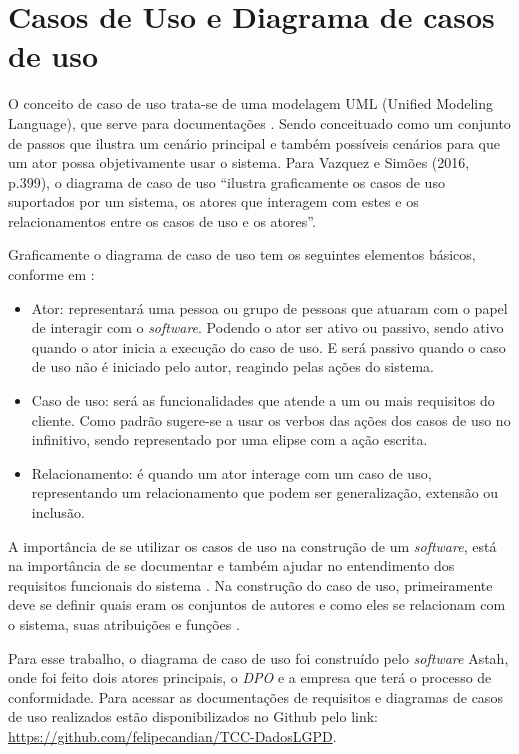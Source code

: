 \documentclass[
	12pt,				%
	openright,			%
	oneside,			%
	a4paper,			%
	english,			%
	french,				%
	spanish,			%
	brazil,				%
	]{abntex2}
\begin{document}
\section{Casos de Uso e Diagrama de casos de uso}

O conceito de caso de uso trata-se de uma modelagem UML (Unified Modeling Language), que serve para documentações  \cite{Sommerville2011}. Sendo conceituado como um conjunto de passos que ilustra um cenário principal e também possíveis cenários para que um ator possa objetivamente usar o sistema. Para Vazquez e Simões (2016, p.399), o diagrama de caso de uso “ilustra graficamente os casos de uso suportados por um sistema, os atores que interagem com estes e os relacionamentos entre os casos de uso e os atores”.

Graficamente o diagrama de caso de uso tem os seguintes elementos básicos, conforme em \cite{Vazquez2016}:

\begin{itemize}
\item Ator: representará uma pessoa ou grupo de pessoas que atuaram com o papel de interagir com o \textit{software}. Podendo o ator ser ativo ou passivo, sendo ativo quando o ator inicia a execução do caso de uso. E será passivo quando o caso de uso não é iniciado pelo autor, reagindo pelas ações do sistema.
\item Caso de uso: será as funcionalidades que atende a um ou mais requisitos do cliente. Como padrão sugere-se a usar os verbos das ações dos casos de uso no infinitivo, sendo representado por uma elipse com a ação escrita.
\item Relacionamento: é quando um ator interage com um caso de uso, representando um relacionamento que podem ser generalização, extensão ou inclusão.
\end{itemize}

A importância de se utilizar os casos de uso na construção de um \textit{software}, está na importância de se documentar e também ajudar no entendimento dos requisitos funcionais do sistema \cite{Fowler2007}. Na construção do caso de uso, primeiramente deve se definir quais eram os conjuntos de autores e como eles se relacionam com o sistema, suas atribuições e funções \cite{Pressman2011}.

Para esse trabalho, o diagrama de caso de uso foi construído pelo \textit{software} Astah, onde foi feito dois atores principais, o \textit{DPO} e a empresa que terá o processo de conformidade. Para acessar as documentações de requisitos e diagramas de casos de uso realizados estão disponibilizados no Github pelo link: \url{https://github.com/felipecandian/TCC-DadosLGPD}.
\end{document}
